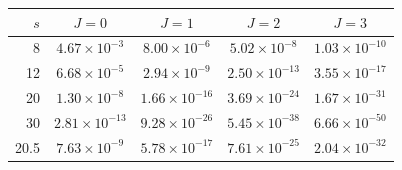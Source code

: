 \begin{tabular}{@{}rcccc@{}}
\toprule
$s$ & $J=0$ & $J=1$ & $J=2$ & $J=3$\\
\midrule
8 & $4.67\times10^{-3}$ & $8.00\times10^{-6}$ & $5.02\times10^{-8}$ & $1.03\times10^{-10}$\\
12 & $6.68\times10^{-5}$ & $2.94\times10^{-9}$ & $2.50\times10^{-13}$ & $3.55\times10^{-17}$\\
20 & $1.30\times10^{-8}$ & $1.66\times10^{-16}$ & $3.69\times10^{-24}$ & $1.67\times10^{-31}$\\
30 & $2.81\times10^{-13}$ & $9.28\times10^{-26}$ & $5.45\times10^{-38}$ & $6.66\times10^{-50}$\\
20.5 & $7.63\times10^{-9}$ & $5.78\times10^{-17}$ & $7.61\times10^{-25}$ & $2.04\times10^{-32}$\\
\bottomrule
\end{tabular}
